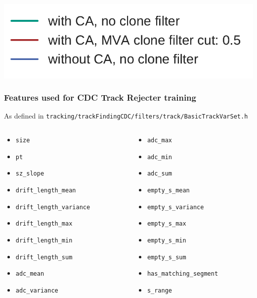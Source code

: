 \documentclass[18pt, aspectratio=169]{beamer}
\begin{document}
\begin{frame}
\begin{columns}
\begin{column}{.5\textwidth}
    \end{column}
  \end{columns}
  \begin{center}
    \includegraphics[width=.2\textwidth]{figures/legend_fom_profile.pdf}
  \end{center}

\end{frame}

\begin{frame}
  \frametitle{Features  used for CDC Track Rejecter training}
  As defined in \texttt{tracking/trackFindingCDC/filters/track/BasicTrackVarSet.h}
  \begin{columns}
    \begin{column}{0.5\textwidth}
      \begin{itemize}
      \item \lstinline{size}
      \item \lstinline{pt}
      \item \lstinline{sz_slope}
      \item \lstinline{drift_length_mean}
      \item \lstinline{drift_length_variance}
      \item \lstinline{drift_length_max}
      \item \lstinline{drift_length_min}
      \item \lstinline{drift_length_sum}
      \item \lstinline{adc_mean}
      \item \lstinline{adc_variance}
      \end{itemize}
    \end{column}
    \begin{column}{0.5\textwidth}
      \begin{itemize}

      \item \lstinline{adc_max}
      \item \lstinline{adc_min}
      \item \lstinline{adc_sum}
      \item \lstinline{empty_s_mean}
      \item \lstinline{empty_s_variance}
      \item \lstinline{empty_s_max}
      \item \lstinline{empty_s_min}
      \item \lstinline{empty_s_sum}
      \item \lstinline{has_matching_segment}
      \item \lstinline{s_range}
      \end{itemize}      
    \end{column}
  \end{columns}
\end{frame}
\end{document}
